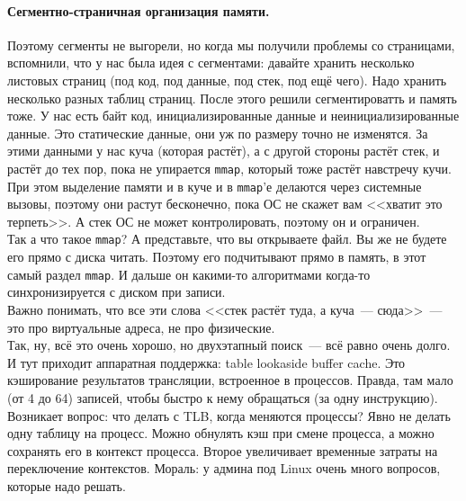 \documentclass{article}
\begin{document}
    \paragraph{Сегментно-страничная организация памяти.}
    Поэтому сегменты не выгорели, но когда мы получили проблемы со страницами, вспомнили, что у нас была идея с сегментами: давайте хранить несколько листовых страниц (под код, под данные, под стек, под ещё чего). Надо хранить несколько разных таблиц страниц. После этого решили сегментироватть и память тоже. У нас есть байт код, инициализированные данные и неинициализированные данные. Это статические данные, они уж по размеру точно не изменятся. За этими данными у нас куча (которая растёт), а с другой стороны растёт стек, и растёт до тех пор, пока не упирается \Verb|mmap|, который тоже растёт навстречу кучи. При этом выделение памяти и в куче и в \Verb|mmap|'е делаются через системные вызовы, поэтому они растут бесконечно, пока ОС не скажет вам <<хватит это терпеть>>. А стек ОС не может контролировать, поэтому он и ограничен.\\
    Так а что такое \Verb|mmap|? А представьте, что вы открываете файл. Вы же не будете его прямо с диска читать. Поэтому его подчитывают прямо в память, в этот самый раздел \Verb|mmap|. И дальше он какими-то алгоритмами когда-то синхронизируется с диском при записи.\\
    Важно понимать, что все эти слова <<стек растёт туда, а куча~--- сюда>>~--- это про виртуальные адреса, не про физические.\\
    Так, ну, всё это очень хорошо, но двухэтапный поиск~--- всё равно очень долго. И тут приходит аппаратная поддержка: table lookaside buffer cache. Это кэширование результатов трансляции, встроенное в процессов. Правда, там мало (от 4 до 64) записей, чтобы быстро к нему обращаться (за одну инструкцию). Возникает вопрос: что делать с TLB, когда меняются процессы? Явно не делать одну таблицу на процесс. Можно обнулять кэш при смене процесса, а можно сохранять его в контекст процесса. Второе увеличивает временные затраты на переключение контекстов. Мораль: у админа под Linux очень много вопросов, которые надо решать.
\end{document}
